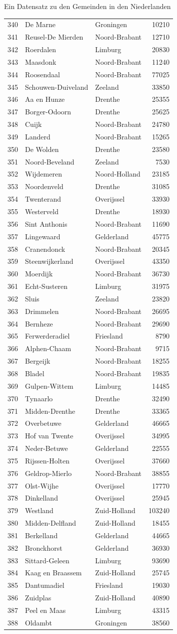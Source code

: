 \documentclass[ignorenonframetext,]{beamer}
\begin{document}
\begin{frame}[fragile]{Ein Datensatz zu den Gemeinden in den
Niederlanden}
\begin{longtable}[]{@{}lllr@{}}
340 & De Marne & Groningen & 10210\tabularnewline
341 & Reusel-De Mierden & Noord-Brabant & 12710\tabularnewline
342 & Roerdalen & Limburg & 20830\tabularnewline
343 & Maasdonk & Noord-Brabant & 11240\tabularnewline
344 & Roosendaal & Noord-Brabant & 77025\tabularnewline
345 & Schouwen-Duiveland & Zeeland & 33850\tabularnewline
346 & Aa en Hunze & Drenthe & 25355\tabularnewline
347 & Borger-Odoorn & Drenthe & 25625\tabularnewline
348 & Cuijk & Noord-Brabant & 24780\tabularnewline
349 & Landerd & Noord-Brabant & 15265\tabularnewline
350 & De Wolden & Drenthe & 23580\tabularnewline
351 & Noord-Beveland & Zeeland & 7530\tabularnewline
352 & Wijdemeren & Noord-Holland & 23185\tabularnewline
353 & Noordenveld & Drenthe & 31085\tabularnewline
354 & Twenterand & Overijssel & 33930\tabularnewline
355 & Westerveld & Drenthe & 18930\tabularnewline
356 & Sint Anthonis & Noord-Brabant & 11690\tabularnewline
357 & Lingewaard & Gelderland & 45775\tabularnewline
358 & Cranendonck & Noord-Brabant & 20345\tabularnewline
359 & Steenwijkerland & Overijssel & 43350\tabularnewline
360 & Moerdijk & Noord-Brabant & 36730\tabularnewline
361 & Echt-Susteren & Limburg & 31975\tabularnewline
362 & Sluis & Zeeland & 23820\tabularnewline
363 & Drimmelen & Noord-Brabant & 26695\tabularnewline
364 & Bernheze & Noord-Brabant & 29690\tabularnewline
365 & Ferwerderadiel & Friesland & 8790\tabularnewline
366 & Alphen-Chaam & Noord-Brabant & 9715\tabularnewline
367 & Bergeijk & Noord-Brabant & 18255\tabularnewline
368 & Bladel & Noord-Brabant & 19835\tabularnewline
369 & Gulpen-Wittem & Limburg & 14485\tabularnewline
370 & Tynaarlo & Drenthe & 32490\tabularnewline
371 & Midden-Drenthe & Drenthe & 33365\tabularnewline
372 & Overbetuwe & Gelderland & 46665\tabularnewline
373 & Hof van Twente & Overijssel & 34995\tabularnewline
374 & Neder-Betuwe & Gelderland & 22555\tabularnewline
375 & Rijssen-Holten & Overijssel & 37660\tabularnewline
376 & Geldrop-Mierlo & Noord-Brabant & 38855\tabularnewline
377 & Olst-Wijhe & Overijssel & 17770\tabularnewline
378 & Dinkelland & Overijssel & 25945\tabularnewline
379 & Westland & Zuid-Holland & 103240\tabularnewline
380 & Midden-Delfland & Zuid-Holland & 18455\tabularnewline
381 & Berkelland & Gelderland & 44665\tabularnewline
382 & Bronckhorst & Gelderland & 36930\tabularnewline
383 & Sittard-Geleen & Limburg & 93690\tabularnewline
384 & Kaag en Braassem & Zuid-Holland & 25745\tabularnewline
385 & Dantumadiel & Friesland & 19030\tabularnewline
386 & Zuidplas & Zuid-Holland & 40890\tabularnewline
387 & Peel en Maas & Limburg & 43315\tabularnewline
388 & Oldambt & Groningen & 38560\tabularnewline

\end{longtable}
\end{frame}
\end{document}
